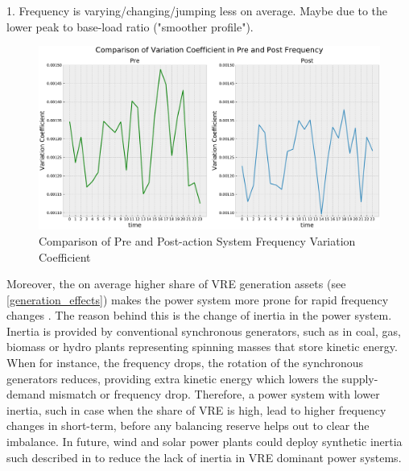 \documentclass[energies,article,submit,moreauthors,pdftex]{Definitions/mdpi}
\begin{document}
1. Frequency is varying/changing/jumping less on average. Maybe due to the lower peak to base-load ratio ("smoother profile").

\begin{figure}[H]
\centering
\hspace{-25pt}\includegraphics[width=16.5 cm]{Graphics/FFreq_VarCoeff_comp_2.pdf}
\caption{Comparison of Pre and Post-action System Frequency Variation Coefficient} \label{fig:freq_hist}
\end{figure}  

Moreover, the on average higher share of VRE generation assets (see \ref{generation_effects}) makes the power system more prone for rapid frequency changes \cite{Ela2011OperatingReserves.}. The reason behind this is the change of inertia in the power system. Inertia is provided by conventional synchronous generators, such as in coal, gas, biomass or hydro plants representing spinning masses that store kinetic energy. When for instance, the frequency drops, the rotation of the synchronous generators reduces, providing extra kinetic energy which lowers the supply-demand mismatch or frequency drop. Therefore, a power system with lower inertia, such in case when the share of VRE is high, lead to higher frequency changes in short-term, before any balancing reserve helps out to clear the imbalance. In future, wind and solar power plants could deploy synthetic inertia such described in \cite{Hansen2014AnalysisTurbines, Zeni2013VirtualTurbines, Liu2017PV-basedSystem} to reduce the lack of inertia in VRE dominant power systems.



\end{document}
